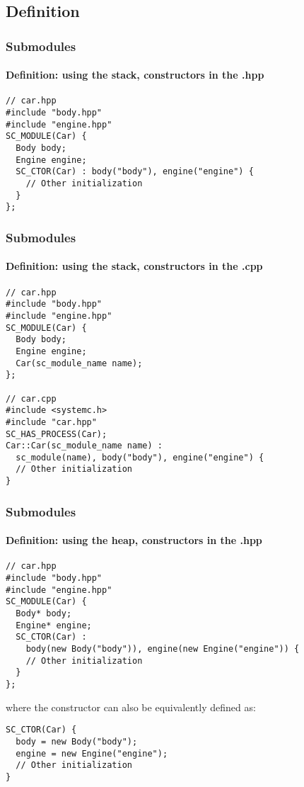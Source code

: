 \subsection{Definition}

\begin{frame}[fragile]
\frametitle{Submodules}
\framesubtitle{Definition: using the stack, constructors in the .hpp}

{\scriptsize
\vspace{-0.5em}
\begin{verbatim}
// car.hpp
#include "body.hpp"
#include "engine.hpp"
SC_MODULE(Car) {
  Body body;
  Engine engine;
  SC_CTOR(Car) : body("body"), engine("engine") {
    // Other initialization
  }
};
\end{verbatim}
}
\end{frame}

\begin{frame}[fragile]
\frametitle{Submodules}
\framesubtitle{Definition: using the stack, constructors in the .cpp}

{\scriptsize
\vspace{-0.5em}
\begin{verbatim}
// car.hpp
#include "body.hpp"
#include "engine.hpp"
SC_MODULE(Car) {
  Body body;
  Engine engine;
  Car(sc_module_name name);
};

// car.cpp
#include <systemc.h>
#include "car.hpp"
SC_HAS_PROCESS(Car);
Car::Car(sc_module_name name) : 
  sc_module(name), body("body"), engine("engine") {
  // Other initialization
}
\end{verbatim}
}
\end{frame}

\begin{frame}[fragile]
\frametitle{Submodules}
\framesubtitle{Definition: using the heap, constructors in the .hpp}

{\scriptsize
\vspace{-0.5em}
\begin{verbatim}
// car.hpp
#include "body.hpp"
#include "engine.hpp"
SC_MODULE(Car) {
  Body* body;
  Engine* engine;
  SC_CTOR(Car) : 
    body(new Body("body")), engine(new Engine("engine")) {
    // Other initialization
  }
};
\end{verbatim}
where the constructor can also be equivalently defined as:
\begin{verbatim}
SC_CTOR(Car) {
  body = new Body("body");
  engine = new Engine("engine");
  // Other initialization
}
\end{verbatim}
}
\end{frame}

